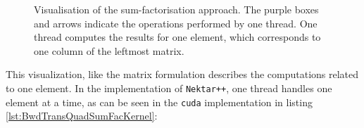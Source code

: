 \begin{figure}[h!]
\caption{Visualisation of the sum-factorisation approach. The purple boxes and arrows indicate the operations performed by one thread. One thread computes the results for one element, which corresponds to one column of the leftmost matrix.}
\label{fig:sumfac_viz}
\end{figure}

This visualization, like the matrix formulation describes the computations related to one element.
In the implementation of \texttt{Nektar++}, one thread handles one element at a time, as can be seen in the \texttt{cuda} implementation in listing \ref{lst:BwdTransQuadSumFacKernel}:

